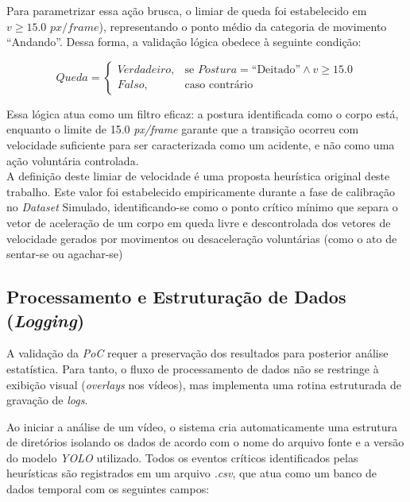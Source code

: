 \documentclass[12pt]{article}
\begin{document}
\begin{enumerate}[label=\Alph*.]
    Para parametrizar essa ação brusca, o limiar de queda foi estabelecido em $v \ge 15.0$ $px/frame$), 
    representando o ponto médio da categoria de movimento ``Andando''. Dessa forma, a validação lógica 
    obedece à seguinte condição:
    
    \begin{equation}
    Queda =
    \begin{cases}
        Verdadeiro, & \text{se } Postura = \text{``Deitado''} \land v \ge 15.0 \\
        Falso, & \text{caso contrário}
    \end{cases}
    \end{equation}

    Essa lógica atua como um filtro eficaz: a postura identificada como o corpo está, enquanto o limite de
    15.0 \textit{px/frame} garante que a transição ocorreu com velocidade suficiente para ser caracterizada
    como um acidente, e não como uma ação voluntária controlada. 
    \\
    
    A definição deste limiar de velocidade é uma proposta heurística original deste trabalho. Este valor
    foi estabelecido empiricamente durante a fase de calibração no \textit{Dataset} Simulado, identificando-se
    como o ponto crítico mínimo que separa o vetor de aceleração de um corpo em queda livre e descontrolada
    dos vetores de velocidade gerados por movimentos ou desaceleração voluntárias (como o ato de sentar-se
    ou agachar-se)
    
    
\end{enumerate}


\subsection{Processamento e Estruturação de Dados (\textit{Logging})}

A validação da \textit{PoC} requer a preservação dos resultados para posterior análise estatística. 
Para tanto, o fluxo de processamento de dados não se restringe à exibição visual (\textit{overlays} 
nos vídeos), mas implementa uma rotina estruturada de gravação de \textit{logs}.

Ao iniciar a análise de um vídeo, o sistema cria automaticamente uma estrutura de diretórios isolando os dados 
de acordo com o nome do arquivo fonte e a versão do modelo \textit{YOLO} utilizado. Todos os eventos críticos identificados
pelas heurísticas são registrados em um arquivo \textit{.csv}, que atua como um banco de dados temporal com os
seguintes campos:
\end{document}
